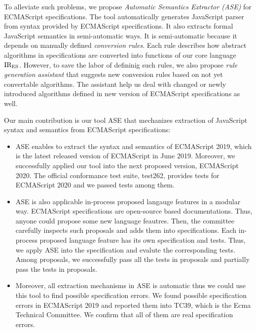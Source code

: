 To alleviate such problems, we propose \textit{Automatic Semantics Extractor (ASE)}
for ECMAScript specifications. The tool automatically generates JavaScript parser
from syntax provided by ECMAScript specifications. It also extracts formal
JavaScript semantics in semi-automatic ways. It is semi-automatic because
it depends on manually defined \textit{conversion rules}. Each rule describes how abstract
algorithms in specifications are converted into functions of our core language \( \text{IR}_\text{ES} \).
However, to save the labor of defininig such rules, we also propose \textit{rule generation assistant}
that suggests new conversion rules based on not yet convertable algorithms.
The assistant help us deal with changed or newly introduced algorithms defined in new version of
ECMAScript specifications as well.

Our main contribution is our tool ASE that mechanizes extraction of JavaScript syntax and semantics
from ECMAScript specifications:
\begin{itemize}
  \item ASE enables to extract the syntax and semantics of ECMAScript 2019,
    which is the latest released version of ECMAScript in June 2019.
    Moreover, we successfully applied our tool into the next proposed version,
    ECMAScript 2020. The official conformance test suite, test262, provides
     tests for ECMAScript 2020 and we passed  tests
    among them.
  \item ASE is also applicable in-process proposed langauge features in a modular way.
    ECMAScript specifications are open-source based documentations. Thus, anyone
    could propose some new language feautres. Then, the committee carefully inspects
    such proposals and adds them into specifications. Each in-process proposed language
    feature has its own specification and tests. Thus, we apply ASE into the specification
    and evalute the corresponding tests. Among  proposals, we successfully
    pass all the tests in  proposals and partially pass the tests in 
    proposals.
  \item Moreover, all extraction mechanisms in ASE is automatic thus we could use this tool
    to find possible specification errors. We found  possible specification errors
    in ECMAScript 2019 and reported them into TC39, which is the Ecma Technical Committee.
    We confirm that all of them are real specification errors.
\end{itemize}
